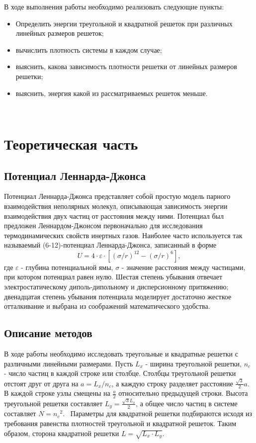 \documentclass[14pt,a4paper,report]{ncc}
\begin{document}
В ходе выполнения работы необходимо реализовать следующие пункты:
\begin{itemize}
\item Определить энергии треугольной и квадратной решеток при различных линейных размеров решеток;
\item вычислить плотность системы в каждом случае;
\item выяснить, какова зависимость плотности решетки от линейных размеров решетки;
\item выяснить, энергия какой из рассматриваемых решеток меньше.
\end{itemize}

\

\newpage\section{Теоретическая часть }
\subsection{Потенциал Леннарда-Джонса}
Потенциал Леннарда-Джонса представляет собой простую модель парного взаимодействия неполярных молекул, описывающая зависимость энергии взаимодействия двух частиц от расстояния между ними.
Потенциал был предложен Леннардом-Джонсом первоначально для исследования термодинамических свойств инертных газов. Наиболее часто используется так называемый (6-12)-потенциал Леннарда-Джонса, записанный в форме 
\
\begin{equation}
 U = 4 \cdot \varepsilon \cdot [(\sigma/r)^{12} - (\sigma/r)^{6}  ] ,
 \end{equation} 
где $\varepsilon$ - глубина потенциальной ямы, $\sigma$ - значение расстояния между частицами, при котором потенциал равен нулю. Шестая степень убывания отвечает электростатическому диполь-дипольному и дисперсионному притяжению; двенадцатая степень убывания потенциала моделирует достаточно жесткое отталкивание и выбрана из соображений математического удобства.
\



\newpage
\subsection{Описание  методов}
В ходе работы необходимо исследовать треугольные и квадратные решетки с различными линейными размерами. Пусть $L_x$ - ширина треугольной решетки, $n_c$ - число частиц в каждой строке или столбце. Столбцы треугольной решетки отстоят друг от друга на $a={L_x}/{n_c}$, а каждую строку разделяет расстояние $\frac{\sqrt{3}}{2} a$. В каждой строке узлы смещены на $\frac{a}{2}$ относительно предыдущей строки. Высота треугольной решетки составляет $L_y=\frac{\sqrt{3}L_x}{2}$, а общее число частиц в системе составляет $N={n_c}^2$. 
\
Параметры для квадратной решетки подбираются исходя из требования равенства плотностей  треугольной и квадратной решеток. Таким образом, сторона квадратной решетки $L=\sqrt{L_x \cdot L_y}$.
\
\end{document}
